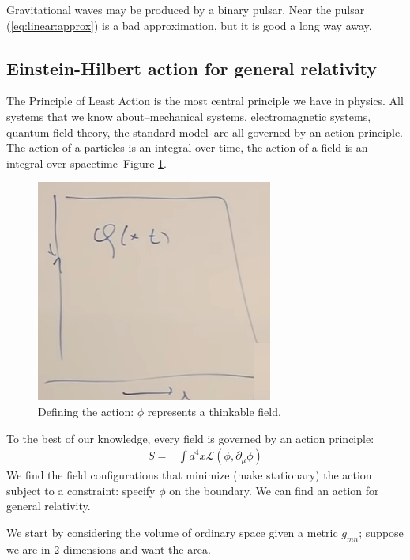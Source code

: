 \documentclass[]{article}
\newcommand{\Lagr}{\mathscr{L}}
\begin{document}
{Gravitational waves may be produced by a binary pulsar. Near the pulsar (\ref{eq:linear:approx}) is a bad approximation, but it is good a long way away.


\subsection{Einstein-Hilbert action for general relativity}

The Principle of Least Action is the most central principle we have in physics. All systems that we know about--mechanical systems, electromagnetic systems, quantum field theory, the standard model--are all governed by an action principle. The action of a particles is an integral over time, the action of a field is an integral over spacetime--Figure \ref{fig:qf-10-field}.

\begin{figure}[H]
	\begin{center}
		\caption{Defining the action: $\phi$ represents a thinkable field.}\label{fig:qf-10-field}
		\includegraphics{qf-10-field}
	\end{center}
\end{figure}  

To the best of our knowledge, every field is governed by an action principle:
\begin{align*}
	S=&\int d^4x \Lagr(\phi,\partial_\mu \phi)
\end{align*}
We find the field configurations that minimize (make stationary) the action subject to a constraint: specify $\phi$ on the boundary.  We can find an action for general relativity.
 
We start by considering the volume of ordinary space given a metric $g_{mn}$; suppose we are in 2 dimensions and want the area.

}
\end{document}
